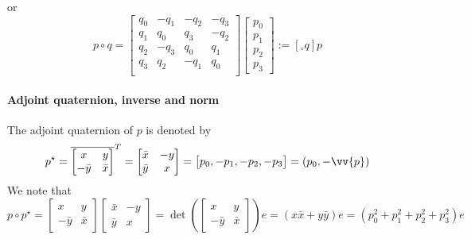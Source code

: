 or
\begin{equation}
  \label{eq:77}
  p \circ q  = 
  \begin{bmatrix}
    q_0 & -q_1 & -q_2 & -q_3 \\
    q_1 & q_0 & q_3 & -q_2 \\
    q_2 & -q_3 & q_0 & q_1 \\
    q_3 & q_2 & -q_1 & q_0 \\
  \end{bmatrix}
  \begin{bmatrix}
    p_0\\
    p_1\\
    p_2\\
    p_3
  \end{bmatrix} := [{}_\circ q] p
\end{equation}

\paragraph{Adjoint quaternion, inverse and norm}
The adjoint quaternion of $p$ is denoted by
\begin{equation}
  p^\star = \overline{  \begin{bmatrix}
      x &y  \\
      - \bar y  & \bar x
    \end{bmatrix}}^T
  =\begin{bmatrix}
    \bar x & - y  \\
    \bar y  &  x
  \end{bmatrix} =
  \begin{bmatrix}
    p_0, -p_1, -p_2, -p_3
  \end{bmatrix} = (p_0, - \vv{p})
\end{equation}
We note that
\begin{equation}
  \label{eq:131}
  p \circ p^\star = 
  \begin{bmatrix}
      x &y  \\
      - \bar y  & \bar x
    \end{bmatrix}
    \begin{bmatrix}
    \bar x & - y  \\
    \bar y  &  x
  \end{bmatrix} = \det(\begin{bmatrix}
      x &y  \\
      - \bar y  & \bar x
    \end{bmatrix}) e = (x\bar x + y \bar y) e  = (p^2_0 + p^2_1+ p_2^2 + p_3^2)e
\end{equation}


